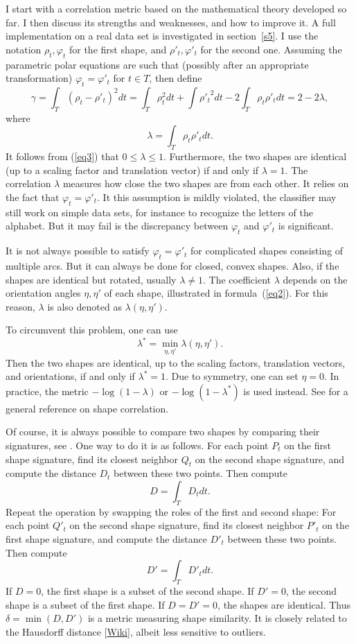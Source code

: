 \documentclass[oneside,10pt]{book}
\begin{document}
I start with a correlation metric based on the mathematical theory developed so far. I then discuss its strengths and weaknesses, and how to improve it. A full implementation on a real data set is investigated in section~\ref{s5}. I use the notation $\rho_t, \varphi_t$ for the first shape,
and $\rho'_t, \varphi'_t$ for the second one. Assuming the parametric polar equations are such that (possibly after an appropriate transformation) $\varphi_t = \varphi'_t$ for $t\in T$, then define
$$\gamma = \int_T (\rho_t - \rho'_t)^2 dt =  \int_T \rho_t^2 dt + \int {\rho'_t}^2 dt - 2\int_T \rho_t\rho'_t dt =2 - 2\lambda, $$
where
$$\lambda = \int_T \rho_t\rho'_t dt. $$
It follows from (\ref{eq3}) that $0\leq \lambda \leq 1$. Furthermore, the two shapes are identical (up to a scaling factor and translation vector) if and only if $\lambda = 1$. The correlation $\lambda$ measures how close the two shapes are from each other. It relies on the fact that $\varphi_t=\varphi'_t$. It this assumption is mildly violated, the classifier may still work on simple data sets, for instance to recognize the letters of the alphabet. But it may fail is the discrepancy between $\varphi_t$ and $\varphi'_t$ is significant.

It is not always possible to satisfy $\varphi_t=\varphi'_t$ for complicated shapes consisting of multiple arcs. But it can always be done for closed, convex shapes. Also, if the shapes are identical but rotated, usually $\lambda \neq 1$. The coefficient $\lambda$ depends  on the orientation angles $\eta,\eta'$
of each shape, illustrated in formula~(\ref{eq2}). For this reason, $\lambda$ is also denoted as  $\lambda(\eta,\eta')$.

\noindent To circumvent this problem, one can use
$$\lambda^* = \min_{\eta,\eta'} \lambda(\eta,\eta').$$
Then the two shapes are identical, up to the scaling factors, translation vectors, and orientations, if and only if $\lambda^*=1$. Due to symmetry, one can set $\eta=0$. In practice, the metric  $-\log(1-\lambda)$ or $-\log(1-\lambda^*)$ is used instead. See \cite{yuviz2012} for a general reference on shape correlation.

\noindent Of course, it is always possible to compare two shapes by comparing their signatures, see \cite{grauman2008}. One way to do it is as follows. For each point $P_t$ on the first shape signature, find its closest neighbor $Q_t$ on the second shape signature, and compute the distance $D_t$ between these two points. Then compute
$$D = \int_T D_t dt.$$
Repeat the operation by swapping the roles of the first and second shape: For each point $Q'_t$ on the second shape signature, find its closest neighbor $P'_t$ on the first shape signature, and compute the distance $D'_t$ between these two points. Then compute
$$D' = \int_T D'_t dt.$$
If $D=0$, the first shape is a subset of the second shape. If $D'=0$, the second shape is a subset of the first shape. If $D=D'=0$, the shapes are identical. Thus $\delta = \min(D,D')$ is a metric measuring shape similarity. It is closely related to the
\textcolor{index}{Hausdorff distance} [\href{https://en.wikipedia.org/wiki/Hausdorff_distance}{Wiki}], albeit less
sensitive to outliers.
\end{document}
